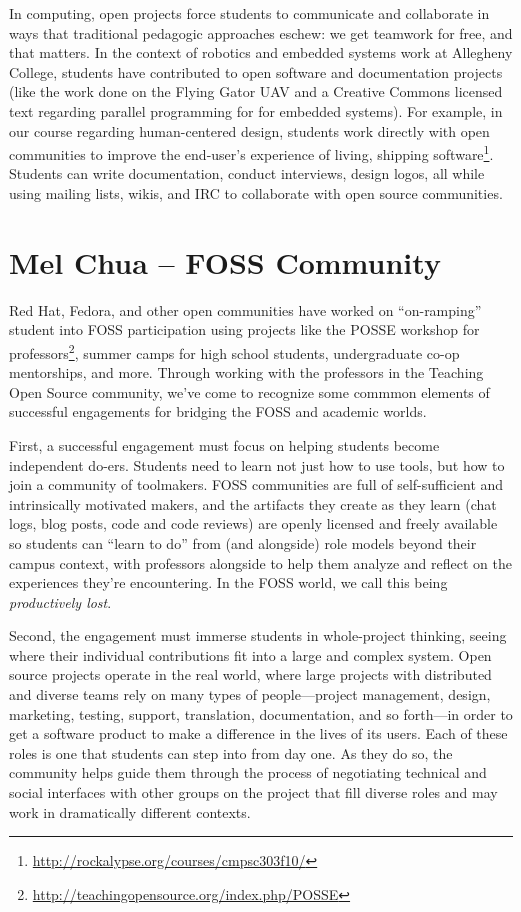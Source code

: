 \documentclass{sig-alternate}
\begin{document}
In computing, open projects force students to communicate and collaborate in ways that traditional pedagogic approaches eschew: we get teamwork for free, and that matters. In the context of robotics and embedded systems work at Allegheny College, students have contributed to open software and documentation projects (like the work done on the Flying Gator UAV and a Creative Commons licensed text regarding parallel programming for for embedded systems). For example, in our course regarding human-centered design, students work directly with open communities to improve the end-user's experience of living, shipping software\footnote{\url{http://rockalypse.org/courses/cmpsc303f10/}}. Students can write documentation, conduct interviews, design logos, all while using mailing lists, wikis, and IRC to collaborate with open source communities. 

\section{Mel Chua -- FOSS Community}

Red Hat, Fedora, and other open communities have worked on ``on-ramping'' student into FOSS participation using projects like the POSSE workshop for professors\footnote{\url{http://teachingopensource.org/index.php/POSSE}}, summer camps for high school students, undergraduate co-op mentorships, and more.  %
 Through working with the professors in the Teaching Open Source community, we've come to recognize some commmon elements of successful engagements for bridging the FOSS and academic worlds.

First, a successful engagement must focus on helping students become independent do-ers. %
Students need to learn not just how to use tools, but how to join a community of toolmakers. FOSS communities are full of self-sufficient and intrinsically motivated makers, and the artifacts they create as they learn (chat logs, blog posts, code and code reviews) are openly licensed and freely available so students can ``learn to do'' from (and alongside) role models beyond their campus context, with professors alongside to help them analyze and reflect on the experiences they're encountering. In the FOSS world, we call this being {\em productively lost}.

Second, the engagement must immerse students in whole-project thinking, seeing where their individual contributions fit into a large and complex system. Open source projects operate in the real world, where large projects with distributed and diverse teams rely on many types of people---project management, design, marketing, testing, support, translation, documentation,  and so forth---in order to get a software product to make a difference in the lives of its users. Each of these roles is one that students can step into from day one. As they do so, the community helps guide them through the process of negotiating technical and social interfaces with other groups on the project that fill diverse roles and may work in dramatically different contexts.
\end{document}
